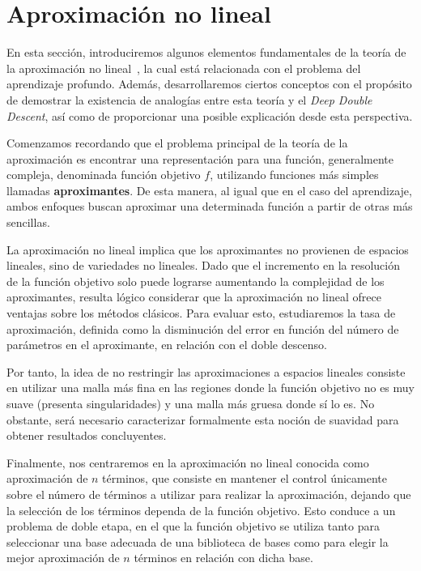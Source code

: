 \section{Aproximación no lineal}\label{sec:aproximacion-no-lineal}

En esta sección, introduciremos algunos elementos fundamentales de la teoría de la aproximación no lineal~\cite{DeVore1998}, la cual está relacionada con el problema del aprendizaje profundo. Además, desarrollaremos ciertos conceptos con el propósito de demostrar la existencia de analogías entre esta teoría y el \textit{Deep Double Descent}, así como de proporcionar una posible explicación desde esta perspectiva.

Comenzamos recordando que el problema principal de la teoría de la aproximación es encontrar una representación para una función, generalmente compleja, denominada función objetivo $f$, utilizando funciones más simples llamadas \textbf{aproximantes}. De esta manera, al igual que en el caso del aprendizaje, ambos enfoques buscan aproximar una determinada función a partir de otras más sencillas.

La aproximación no lineal implica que los aproximantes no provienen de espacios lineales, sino de variedades no lineales. Dado que el incremento en la resolución de la función objetivo solo puede lograrse aumentando la complejidad de los aproximantes, resulta lógico considerar que la aproximación no lineal ofrece ventajas sobre los métodos clásicos. Para evaluar esto, estudiaremos la tasa de aproximación, definida como la disminución del error en función del número de parámetros en el aproximante, en relación con el doble descenso.

Por tanto, la idea de no restringir las aproximaciones a espacios lineales consiste en utilizar una malla más fina en las regiones donde la función objetivo no es muy suave (presenta singularidades) y una malla más gruesa donde sí lo es. No obstante, será necesario caracterizar formalmente esta noción de suavidad para obtener resultados concluyentes.

Finalmente, nos centraremos en la aproximación no lineal conocida como aproximación de $n$ términos, que consiste en mantener el control únicamente sobre el número de términos a utilizar para realizar la aproximación, dejando que la selección de los términos dependa de la función objetivo. Esto conduce a un problema de doble etapa, en el que la función objetivo se utiliza tanto para seleccionar una base adecuada de una biblioteca de bases como para elegir la mejor aproximación de $n$ términos en relación con dicha base.

